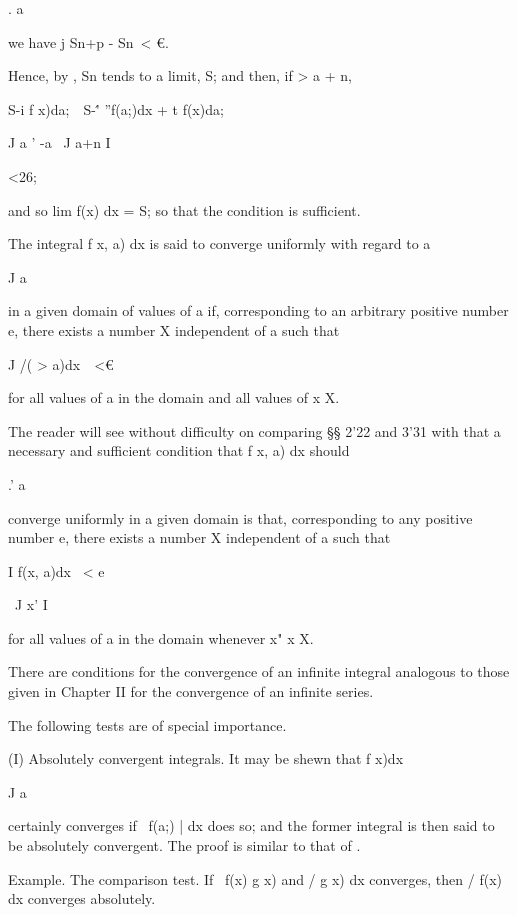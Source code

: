 . a

we have j Sn+p - Sn\ < €.

Hence, by , Sn tends to a limit, S; and then, if > a + n,

S-i f x)da;\ \ S-\'' ''f(a;)dx + t f(x)da;\

J a ' -a \ J a+n I

<26;

and so lim f(x) dx = S; so that the condition is sufficient.


The integral f x, a) dx is said to converge uniformly with regard to a

J a

in a given domain of values of a if, corresponding to an arbitrary
positive number e, there exists a number X independent of a such that

J /( > a)dx\ \ <€

for all values of a in the domain and all values of x X.

The reader will see without difficulty on comparing §§ 2'22 and 3'31
with  that a necessary and sufficient condition that f x, a) dx
should

.' a

converge uniformly in a given domain is that, corresponding to any
positive number e, there exists a number X independent of a such that

I f(x, a)dx \ < e

\ J x' I

for all values of a in the domain whenever x" x X.


There are conditions for the convergence of an infinite integral
analogous to those given in Chapter II for the convergence of an
infinite series.

The following tests are of special importance.

%
%

(I) Absolutely convergent integrals. It may be shewn that f x)dx

J a

certainly converges if \ f(a;) | dx does so; and the former integral
is then said to be absolutely convergent. The proof is similar to that
of .

Example. The comparison test. If \ f(x) g x) and / g x) dx converges,
then / f(x) dx converges absolutely.

